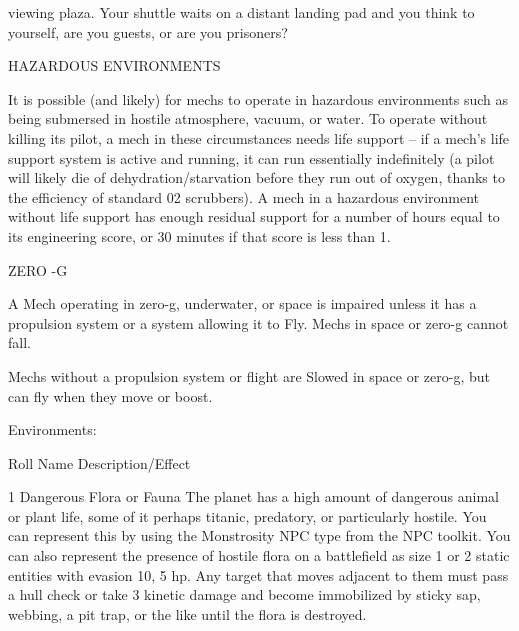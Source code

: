     viewing plaza. Your shuttle waits on a distant landing pad and you think to yourself, are
    you guests, or are you prisoners?




HAZARDOUS ENVIRONMENTS

It is possible (and likely) for mechs to operate in hazardous environments such as being
submersed in hostile atmosphere, vacuum, or water. To operate without killing its pilot, a mech in
these circumstances needs life support -- if a mech’s life support system is active and running,
it can run essentially indefinitely (a pilot will likely die of dehydration/starvation before they run
out of oxygen, thanks to the efficiency of standard 02 scrubbers). A mech in a hazardous
environment without life support has enough residual support for a number of hours equal to its
engineering score, or 30 minutes if that score is less than 1.


                                                 ZERO -G

A Mech operating in zero-g, underwater, or space is impaired unless it has a propulsion system
or a system allowing it to Fly. Mechs in space or zero-g cannot fall.


Mechs without a propulsion system or flight are Slowed in space or zero-g, but can fly when
they move or boost.


                                              Environments:


 Roll    Name                                Description/Effect

 1       Dangerous Flora or Fauna            The planet has a high amount of dangerous animal or
                                             plant life, some of it perhaps titanic, predatory, or
                                             particularly hostile. You can represent this by using the
                                             Monstrosity NPC type from the NPC toolkit. You can
                                             also represent the presence of hostile flora on a
                                             battlefield as size 1 or 2 static entities with evasion 10,
                                             5 hp. Any target that moves adjacent to them must
                                             pass a hull check or take 3 kinetic damage and become
                                             immobilized by sticky sap, webbing, a pit trap, or the
                                             like until the flora is destroyed.

